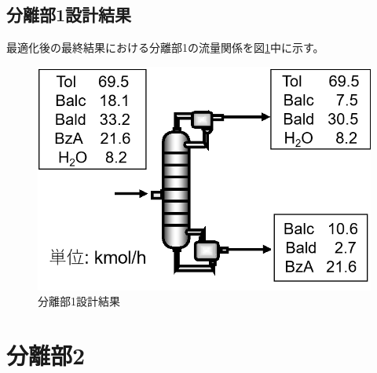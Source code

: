 \documentclass[a4j]{jsreport}
\begin{document}
\section{分離部1設計結果}
最適化後の最終結果における分離部1の流量関係を図\ref{分離部1設計結果の図}中に示す。
\begin{figure}[h]
    \begin{center}
        \includegraphics[scale=0.7]{Separation1Conclusion.png}
        \caption{分離部1設計結果}
        \label{分離部1設計結果の図}
    \end{center}
\end{figure}


\newpage
\chapter{分離部2}
\end{document}
